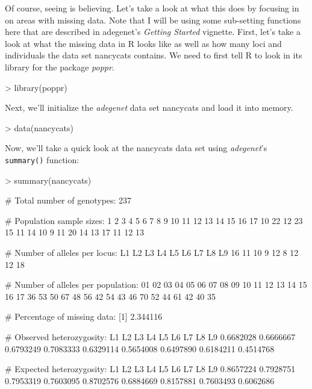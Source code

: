 \documentclass[letterpaper]{article}
\begin{document}
Of course, seeing is believing. Let's take a look at what this does by focusing in on areas with missing data. Note that I will be using some sub-setting functions here that are described in adegenet's \textit{Getting Started} vignette. First, let's take a look at what the missing data in R looks like as well as how many loci and individuals the data set nancycats contains. We need to first tell R to look in its library for the package \textit{poppr}.
\begin{Schunk}
\begin{Sinput}
> library(poppr)
\end{Sinput}
\end{Schunk}
Next, we'll initialize the \textit{adegenet} data set nancycats and load it into memory.
\begin{Schunk}
\begin{Sinput}
> data(nancycats)
\end{Sinput}
\end{Schunk}
Now, we'll take a quick look at the nancycats data set using \textit{adegenet}'s \texttt{summary()}  function:
\begin{Schunk}
\begin{Sinput}
> summary(nancycats)
\end{Sinput}
\begin{Soutput}
 # Total number of genotypes:  237 

 # Population sample sizes:  
 1  2  3  4  5  6  7  8  9 10 11 12 13 14 15 16 17 
10 22 12 23 15 11 14 10  9 11 20 14 13 17 11 12 13 

 # Number of alleles per locus:  
L1 L2 L3 L4 L5 L6 L7 L8 L9 
16 11 10  9 12  8 12 12 18 

 # Number of alleles per population:  
01 02 03 04 05 06 07 08 09 10 11 12 13 14 15 16 17 
36 53 50 67 48 56 42 54 43 46 70 52 44 61 42 40 35 

 # Percentage of missing data:  
[1] 2.344116

 # Observed heterozygosity:  
       L1        L2        L3        L4        L5        L6        L7        L8        L9 
0.6682028 0.6666667 0.6793249 0.7083333 0.6329114 0.5654008 0.6497890 0.6184211 0.4514768 

 # Expected heterozygosity:  
       L1        L2        L3        L4        L5        L6        L7        L8        L9 
0.8657224 0.7928751 0.7953319 0.7603095 0.8702576 0.6884669 0.8157881 0.7603493 0.6062686 
\end{Soutput}
\end{Schunk}
\end{document}

